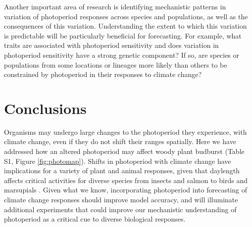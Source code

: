 \documentclass{article}
\begin{document}
\par Another important area of research is identifying  mechanistic patterns in variation of photoperiod responses across species and populations, as well as the consequences of this variation. Understanding the extent to which this variation is predictable will be particularly beneficial for forecasting. For example, what traits are associated with photoperiod sensitivity and does variation in photoperiod sensitivity have a strong genetic component? If so, are species or populations from some locations or lineages more likely than others to be constrained by photoperiod in their responses to climate change?

\section*{Conclusions}
Organisms may undergo large changes to the photoperiod they experience, with climate change, even if they do not shift their ranges spatially. Here we have addressed how an altered photoperiod may affect woody plant budburst (Table S1, Figure \ref{fig:photomap}). Shifts in photoperiod with climate change have implications for a variety of plant and animal responses, given that daylength affects critical activities for diverse species from insects \citep{bradshaw2006,linn1996} and salmon \citep{solbakken1994,taranger2003} to birds \citep{dawson2001} and marsupials \citep{mcallan2006,solbakken1994}. Given what we know, incorporating photoperiod into forecasting of climate change responses should improve model accuracy, and will illuminate additional experiments that could improve our mechanistic understanding of photoperiod as a critical cue to diverse biological responses. 
\end{document}
